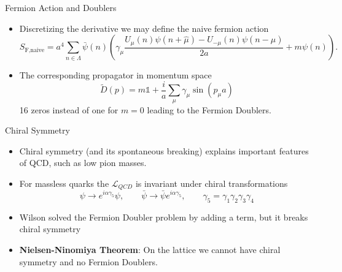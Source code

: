 \documentclass[
	english, %
	design=2023, %
	]{tudabeamer}
\newcommand{\Lagr}{\mathcal{L}}
\newcommand{\rbr}[1]{\left(#1\right)}
\begin{document}
\begin{frame}{Fermion Action and Doublers}
    \begin{itemize}
        \item Discretizing the derivative we may define the naive fermion action
        \begin{equation}
             S_{\text{F,naive}}=a^4\sum_{n\in\Lambda}\bar\psi(n) \rbr{\gamma_\mu\frac{U_\mu(n)\psi(n+\hat\mu)-U_{-\mu}(n)\psi(n-\hat\mu)}{2a}+m\psi(n)}.
        \end{equation}
        \item The corresponding propagator in momentum space
        \begin{equation}
            \tilde D(p)=m\mathbb 1 +\frac{i}{a}\sum_\mu\gamma_\mu\sin(p_\mu a)
        \end{equation}
        16 zeros instead of one for $m=0$ leading to the Fermion Doublers.
    \end{itemize}
\end{frame}

\begin{frame}{Chiral Symmetry}
    \begin{itemize}
        \item Chiral symmetry (and its spontaneous breaking) explains important features of QCD, such as low pion masses.
        \item For massless quarks the $\Lagr_{QCD}$ is invariant under chiral transformations
        \begin{equation}
            \psi\rightarrow e^{i\alpha\gamma_5}\psi,\qquad \bar\psi\rightarrow\bar\psi e^{i\alpha\gamma_5},\qquad \gamma_5=\gamma_1\gamma_2\gamma_3\gamma_4
        \end{equation}
        \item Wilson solved the Fermion Doubler problem by adding a term, but it breaks chiral symmetry
        \item \textbf{Nielsen-Ninomiya Theorem}: On the lattice we cannot have chiral symmetry and no Fermion Doublers.
    \end{itemize}
\end{frame}
\end{document}
